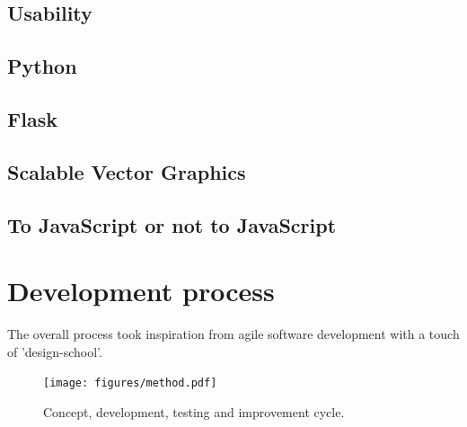\documentclass[nofilelist,dvipsnames]{cslthse-msc}
\begin{document}
    \section{Usability}

    \section{Python}

    \section{Flask}

    \section{Scalable Vector Graphics}

    \section{To JavaScript or not to JavaScript}

	\chapter{Development process}

    The overall process took inspiration from agile software development with a
    touch of 'design-school'. 

    \begin{figure}[h!]
      \centering
      \texttt{[image: figures/method.pdf]}
      \caption{Concept, development, testing and improvement cycle.}
    \end{figure}
\end{document}

